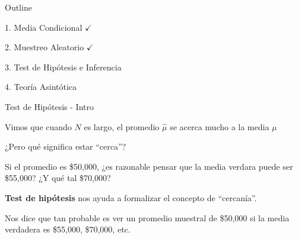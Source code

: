\documentclass[11pt,handout,aspectratio=169]{beamer}
\newenvironment{wideitemize}{\itemize\addtolength{\itemsep}{10pt}}{\enditemize}
\begin{document}
\begin{frame}{Outline}
	
	\textcolor{red!75!green!50!blue!25!gray}{1. Media Condicional} $\checkmark$
	\vspace{0.8cm}
	
	
	\textcolor{red!75!green!50!blue!25!gray}{2. Muestreo Aleatorio} $\checkmark$
	
	\vspace{0.8cm}
	3. Test de Hipótesis e Inferencia
	
	\vspace{0.8cm}
	4. Teoría Asintótica	
	
\end{frame}

\begin{frame}{Test de Hipótesis - Intro}
\begin{wideitemize}

\item
Vimos que cuando $N$ es largo, el promedio $\hat\mu$ se acerca mucho a la media $\mu$

\item
¿Pero qué significa estar ``cerca''?

\item
Si el promedio es \$50,000, ¿es razonable pensar que la media verdara puede ser \$55,000? ¿Y qué tal \$70,000? 

\pause
\item
\textbf{Test de hipótesis} nos ayuda a formalizar el concepto de ``cercanía''.

\pause
\item
Nos dice que tan probable es ver un promedio muestral de \$50,000 si la media verdadera es \$55,000,  \$70,000, etc.

\end{wideitemize}
\end{frame}
\end{document}
